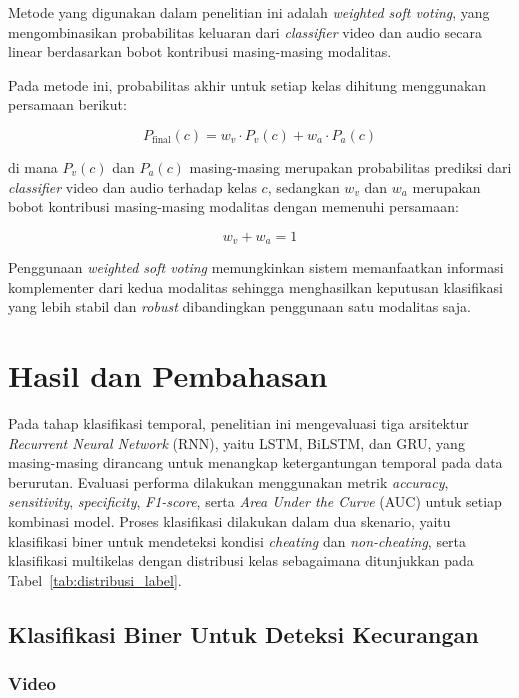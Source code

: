 \documentclass {rapidsart}
\theoremstyle{plain}
\theoremstyle{remark}
\theoremstyle{definition}
\begin{document}
Metode yang digunakan dalam penelitian ini adalah \textit{weighted soft voting}, yang mengombinasikan probabilitas keluaran dari \textit{classifier} video dan audio secara linear berdasarkan bobot kontribusi masing-masing modalitas.

Pada metode ini, probabilitas akhir untuk setiap kelas dihitung menggunakan persamaan berikut:

\begin{equation}
P_{\text{final}}(c)
=
w_v \cdot P_v(c)
+
w_a \cdot P_a(c)
\label{eq:weighted_soft_voting}
\end{equation}

di mana $P_v(c)$ dan $P_a(c)$ masing-masing merupakan probabilitas prediksi dari \textit{classifier} video dan audio terhadap kelas $c$, sedangkan $w_v$ dan $w_a$ merupakan bobot kontribusi masing-masing modalitas dengan memenuhi persamaan:

\begin{equation}
w_v + w_a = 1
\label{eq}
\end{equation}

Penggunaan \textit{weighted soft voting} memungkinkan sistem memanfaatkan informasi komplementer dari kedua modalitas sehingga menghasilkan keputusan klasifikasi yang lebih stabil dan \textit{robust} dibandingkan penggunaan satu modalitas saja.


\section{Hasil dan Pembahasan}
Pada tahap klasifikasi temporal, penelitian ini mengevaluasi tiga arsitektur \textit{Recurrent Neural Network} (RNN), yaitu LSTM, BiLSTM, dan GRU, yang masing-masing dirancang untuk menangkap ketergantungan temporal pada data berurutan. Evaluasi performa dilakukan menggunakan metrik \textit{accuracy}, \textit{sensitivity}, \textit{specificity}, \textit{F1-score}, serta \textit{Area Under the Curve} (AUC) untuk setiap kombinasi model. Proses klasifikasi dilakukan dalam dua skenario, yaitu klasifikasi biner untuk mendeteksi kondisi \textit{cheating} dan \textit{non-cheating}, serta klasifikasi multikelas dengan distribusi kelas sebagaimana ditunjukkan pada Tabel~\ref{tab:distribusi_label}.

\subsection{Klasifikasi Biner Untuk Deteksi Kecurangan}
\subsubsection{Video}
\end{document}
